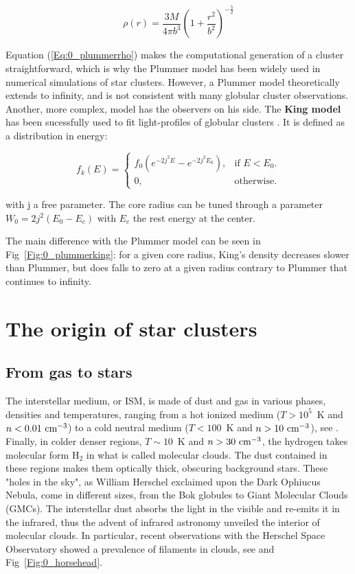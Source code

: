 \begin{equation}
\label{Eq:0_plummerrho}
\rho(r) = \frac{3 M}{4 \pi b^3} \left( 1 + \frac{r^2}{b^2} \right) ^{- \frac{5}{2}}
\end{equation}

Equation (\ref{Eq:0_plummerrho}) makes the computational generation of a cluster straightforward, which is why the Plummer model has been widely used in numerical simulations of star clusters.
However, a Plummer model theoretically extends to infinity, and is not consistent with many globular cluster observations. Another, more complex, model has the observers on his side. The \textbf{King model} has been sucessfully used to fit light-profiles of globular clusters \citep{King1981}. It is defined as a distribution in energy:

\begin{equation}
  f_k(E)=\begin{cases}
    f_0 \left(e^{-2j^2E} - e^{-2j^2E_0}\right)  , & \text{if $E<E_0$}.\\
    0, & \text{otherwise}.
  \end{cases}
\end{equation}

with j a free parameter. The core radius can be tuned through a parameter $W_0 =2j^2(E_0 - E_c)$ with $E_c$ the rest energy at the center. 

The main difference with the Plummer model can be seen in Fig~\ref{Fig:0_plummerking}: for a given core radius, King's density decreases slower than Plummer, but does falls to zero at a given radius contrary to Plummer that continues to infinity.






\section{The origin of star clusters}

\subsection{From gas to stars}

The interstellar medium, or ISM, is made of dust and gas in various phases, densities and temperatures, ranging from a hot ionized medium ($T>10^5 $~K and $n < 0.01 ~{\textrm{cm}}^{-3}$) to a cold neutral medium ($T<100$~K and $n > 10 ~{\textrm{cm}}^{-3}$),  see \cite{Field1969}. Finally, in colder denser regions, $T\sim 10$~K and $n>30~{\textrm{cm}}^{-3}$, the hydrogen takes molecular form H$_2$ in what is called molecular clouds. The dust contained in these regions makes them optically thick, obscuring background stars. These "holes in the sky", as William Herschel exclaimed upon the Dark Ophiucus Nebula\citep{Houghton1942}, come in different sizes, from the Bok globules to Giant Molecular Clouds (GMCs).
The interstellar dust absorbs the light in the visible and re-emits it in the infrared, thus the advent of infrared astronomy unveiled the interior of molecular clouds. In particular, recent observations with the Herschel Space Observatory showed a prevalence of filaments in clouds, see \cite{Andre2010} and Fig~\ref{Fig:0_horsehead}.

